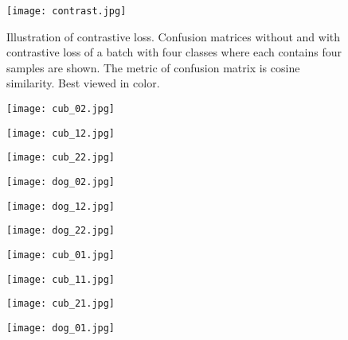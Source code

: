 \documentclass[10pt,twocolumn,letterpaper]{article}
\begin{document}
\begin{figure}[h]
    \centering
    \texttt{[image: contrast.jpg]}
    \caption{Illustration of contrastive loss. Confusion matrices without and with contrastive loss of a batch with four classes where each contains four samples are shown. The metric of confusion matrix is cosine similarity. Best viewed in color.}
    \label{fig:confusion}
\end{figure}

\begin{figure*}[ht]
    \centering
    \begin{subfigure}{0.16\linewidth}
        \centering
		\texttt{[image: cub\_02.jpg]}
    \end{subfigure}
    \begin{subfigure}{0.16\linewidth}
        \centering
		\texttt{[image: cub\_12.jpg]}
    \end{subfigure}
    \begin{subfigure}{0.16\linewidth}
        \centering
		\texttt{[image: cub\_22.jpg]}
    \end{subfigure}
    \begin{subfigure}{0.16\linewidth}
        \centering
		\texttt{[image: dog\_02.jpg]}
    \end{subfigure}
    \begin{subfigure}{0.16\linewidth}
        \centering
		\texttt{[image: dog\_12.jpg]}
    \end{subfigure}
    \begin{subfigure}{0.16\linewidth}
        \centering
		\texttt{[image: dog\_22.jpg]}
    \end{subfigure}
    \begin{subfigure}{0.16\linewidth}
        \centering
		\texttt{[image: cub\_01.jpg]}
    \end{subfigure}
    \begin{subfigure}{0.16\linewidth}
        \centering
		\texttt{[image: cub\_11.jpg]}
    \end{subfigure}
    \begin{subfigure}{0.16\linewidth}
        \centering
		\texttt{[image: cub\_21.jpg]}
    \end{subfigure}
    \begin{subfigure}{0.16\linewidth}
        \centering
		\texttt{[image: dog\_01.jpg]}
    \end{subfigure}

\end{figure*}
\end{document}
